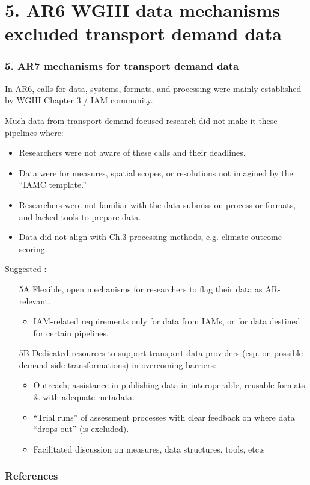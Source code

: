 \documentclass[12pt,aspectratio=169]{beamer}
\begin{document}
\section{5. AR6 WGIII data mechanisms excluded transport demand data}
\begin{frame}[allowframebreaks]
\frametitle{5. AR7 mechanisms for transport demand data}

In AR6, calls for data, systems, formats, and processing were mainly established by WGIII Chapter 3 / IAM community.

\smallskip
Much data from transport demand-focused research did not make it  these pipelines where:
\begin{itemize}
  \item Researchers were not aware of these calls and their deadlines.
  \item Data were for measures, spatial scopes, or resolutions not imagined by the “IAMC template.”
  \item Researchers were not familiar with the data submission process or formats, and lacked tools to prepare data.
  \item Data did not align with Ch.3 processing methods, e.g. climate outcome scoring.
\end{itemize}

\framebreak
Suggested :
\begin{enumerate}
  \item [5A] Flexible, open mechanisms for researchers to flag their data as AR-relevant.
    \begin{itemize}
      \item IAM-related requirements only for data from IAMs, or for data destined for certain pipelines.
    \end{itemize}
  \item [5B] Dedicated resources to support transport data providers (esp. on possible demand-side transformations) in overcoming barriers:
    \begin{itemize}
      \item Outreach; assistance in publishing data in interoperable, reusable formats \& with adequate metadata.
      \item “Trial runs” of assessment processes with clear feedback on where data “drops out” (is excluded).
      \item Facilitated discussion on measures, data structures, tools, etc.s
    \end{itemize}
\end{enumerate}

\end{frame}

\makefinalslide

\appendix

\begin{frame}[allowframebreaks]
\frametitle{References}

\printbibliography[heading=none]

\end{frame}
\end{document}
